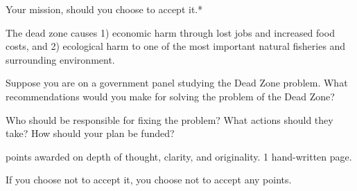 \documentclass[t]{beamer}
\begin{document}
\begin{frame}{Your mission, should you choose to accept it.*}

	\hangpara The dead zone causes 1) economic harm through lost jobs and increased food costs, and 2) ecological harm to one of the most important natural fisheries and surrounding environment. 
	
	\hangpara Suppose you are on a government panel studying the Dead Zone problem. What recommendations would you make for solving the problem of the Dead Zone?
	
	\hangpara Who should be responsible for fixing the problem? What actions should they take?  How should your plan be funded?
	
	 points awarded on depth of thought, clarity, and originality.  1 hand-written page.

	\vfilll
	
	\hfill \tiny *If you choose not to accept it, you choose not to accept any points.

\end{frame}
\end{document}
